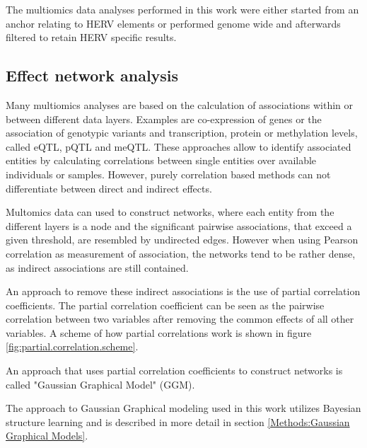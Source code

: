 \documentclass[a4paper,12pt,twoside,openright]{article}
\begin{document}

The multiomics data analyses performed in this work were either started from an anchor relating to HERV elements or performed genome wide and afterwards filtered to retain HERV specific results. 

\subsection{Effect network analysis}
\label{Introduction:Effect network analysis}
Many multiomics analyses are based on the calculation of associations within or between different data layers. Examples are co-expression of genes or the association of genotypic variants and transcription,  protein or methylation levels, called eQTL, pQTL and meQTL. These approaches allow to identify associated entities by calculating correlations between single entities over available individuals or samples. However, purely correlation based methods can not differentiate between direct and indirect effects\cite{Hasin2017}.

Multomics data can used to construct networks, where each entity from the different layers is a node and the significant pairwise associations, that exceed a given threshold, are resembled by undirected edges. However when using Pearson correlation as measurement of association, the networks tend to be rather dense, as indirect associations are still contained\cite{Krumsiek2011}. 

An approach to remove these indirect associations is the use of partial correlation coefficients. The partial correlation coefficient can be seen as the pairwise correlation between two variables after removing the common effects of all other variables. A scheme of how partial correlations work is shown in figure \ref{fig:partial.correlation.scheme}.

An approach that uses partial correlation coefficients to construct networks is called "Gaussian Graphical Model"\cite{Krumsiek2011} (GGM). 

The approach to Gaussian Graphical modeling used in this work utilizes Bayesian structure learning and is described in more detail in section \ref{Methods:Gaussian Graphical Models}.
\end{document}
